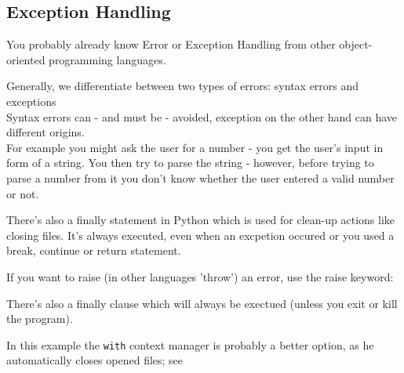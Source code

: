     \subsection{Exception Handling}
        You probably already know Error or Exception Handling from other object-oriented
        programming languages.

        Generally, we differentiate between two types of errors: syntax errors and exceptions \\
        Syntax errors can - and must be - avoided, exception on the other hand can have different
        origins. \\
        For example you might ask the user for a number - you get the user's input in form
        of a string. You then try to parse the string - however, before trying to parse a number
        from it you don't know whether the user entered a valid number or not.

        There's also a finally statement in Python which is used for clean-up actions like
        closing files. It's always executed, even when an excpetion occured or you used a break,
        continue or return statement.


        If you want to raise (in other languages 'throw') an error, use the raise keyword:

        There's also a finally clause which will always be exectued (unless you exit or kill
        the program).

        In this example the \texttt{with} context manager is probably a better option,
        as he automatically closes opened files; see 